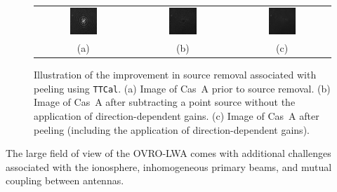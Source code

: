 \begin{bibunit}
\begin{figure}
    \centering
    \begin{tabular}{ccc}
        \includegraphics[width=0.3\textwidth]{figures/chapter2/cas-a-no-removal} &
        \includegraphics[width=0.3\textwidth]{figures/chapter2/cas-a-subtraction} &
        \includegraphics[width=0.3\textwidth]{figures/chapter2/cas-a-peeling} \\
        (a) & (b) & (c) \\
    \end{tabular}
    \caption{
        Illustration of the improvement in source removal associated with peeling using
        \texttt{TTCal}. (a) Image of Cas~A prior to source removal. (b) Image of Cas~A after
        subtracting a point source without the application of direction-dependent gains. (c) Image
        of Cas~A after peeling (including the application of direction-dependent gains).
    }
    \label{fig:peeling-illustration}
\end{figure}

The large field of view of the OVRO-LWA comes with additional challenges associated with the
ionosphere, inhomogeneous primary beams, and mutual coupling between antennas.


\end{bibunit}
